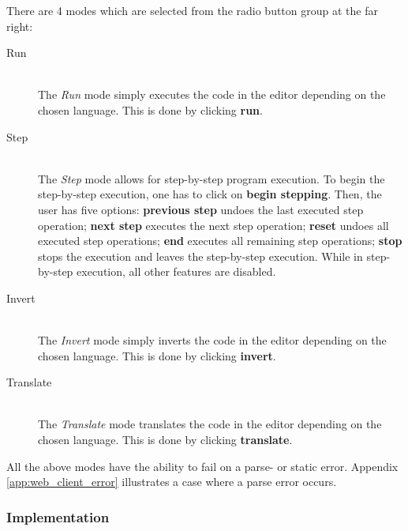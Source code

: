There are 4 modes which are selected from the radio button group at the far right:
\begin{description}

  \item[Run]~\\
    The \textit{Run} mode simply executes the code in the editor depending on the chosen language. This is done by clicking  \textbf{run}.

  \item[Step]~\\
    The \textit{Step} mode allows for step-by-step program execution. %
    To begin the step-by-step execution, one has to click on  \textbf{begin stepping}. Then, the user has five options:
     \textbf{previous step} undoes the last executed step operation;
     \textbf{next step} executes the next step operation;
     \textbf{reset} undoes all executed step operations;
     \textbf{end} executes all remaining step operations;
     \textbf{stop} stops the execution and leaves the step-by-step execution.
    While in step-by-step execution, all other features are disabled.

  \item[Invert]~\\
    The \textit{Invert} mode simply inverts the code in the editor depending on the chosen language. This is done by clicking  \textbf{invert}.

  \item[Translate]~\\
    The \textit{Translate} mode translates the code in the editor depending on the chosen language. This is done by clicking  \textbf{translate}.

\end{description}
All the above modes have the ability to fail on a parse- or static error. Appendix \ref{app:web_client_error} illustrates a case where a parse error occurs.


\subsubsection{Implementation}

